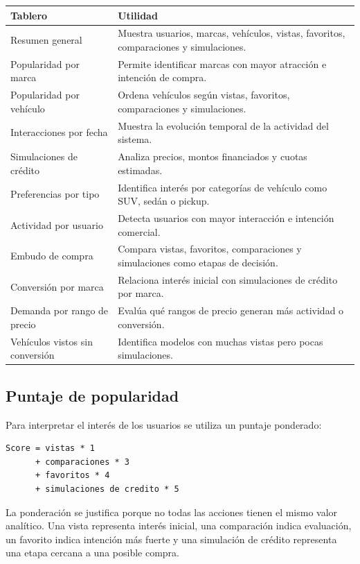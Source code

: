 \documentclass[12pt,letterpaper]{article}
\begin{document}
\begin{longtable}{p{4cm}p{10cm}}
\toprule
\textbf{Tablero} & \textbf{Utilidad} \\
\midrule
\endhead
Resumen general & Muestra usuarios, marcas, vehículos, vistas, favoritos, comparaciones y simulaciones. \\
Popularidad por marca & Permite identificar marcas con mayor atracción e intención de compra. \\
Popularidad por vehículo & Ordena vehículos según vistas, favoritos, comparaciones y simulaciones. \\
Interacciones por fecha & Muestra la evolución temporal de la actividad del sistema. \\
Simulaciones de crédito & Analiza precios, montos financiados y cuotas estimadas. \\
Preferencias por tipo & Identifica interés por categorías de vehículo como SUV, sedán o pickup. \\
Actividad por usuario & Detecta usuarios con mayor interacción e intención comercial. \\
Embudo de compra & Compara vistas, favoritos, comparaciones y simulaciones como etapas de decisión. \\
Conversión por marca & Relaciona interés inicial con simulaciones de crédito por marca. \\
Demanda por rango de precio & Evalúa qué rangos de precio generan más actividad o conversión. \\
Vehículos vistos sin conversión & Identifica modelos con muchas vistas pero pocas simulaciones. \\
\bottomrule
\end{longtable}

\subsection{Puntaje de popularidad}

Para interpretar el interés de los usuarios se utiliza un puntaje ponderado:

\begin{lstlisting}[style=textstyle]
Score = vistas * 1
      + comparaciones * 3
      + favoritos * 4
      + simulaciones de credito * 5
\end{lstlisting}

La ponderación se justifica porque no todas las acciones tienen el mismo valor analítico. Una vista representa interés inicial, una comparación indica evaluación, un favorito indica intención más fuerte y una simulación de crédito representa una etapa cercana a una posible compra.
\end{document}
